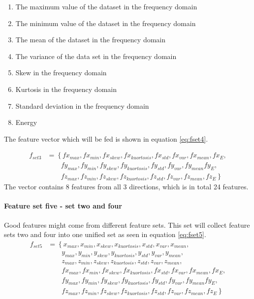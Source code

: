 \documentclass[USenglish]{ifimaster}  %
\begin{document}
\begin{enumerate}
		\item The maximum value of the dataset in the frequency domain
		\item The minimum value of the dataset in the frequency domain
		\item The mean of the dataset in the frequency domain
		\item The variance of the data set in the frequency domain
		\item Skew in the frequency domain
		\item Kurtosis in the frequency domain 
		\item Standard deviation in the frequency domain
		\item Energy 
\end{enumerate}
The feature vector which will be fed is shown in equation \ref{eq:fset4}.

\begin{align}\label{eq:fset4}
	f_{set3} &= \left\{fx_{max},fx_{min},fx_{skew},fx_{kuortosis},fx_{std},fx_{var},fx_{mean},fx_{E}, \right.\nonumber\\
	&\qquad \left.{} fy_{max},fy_{min},fy_{skew},fy_{kuortosis},fy_{std},fy_{var},fy_{mean}fy_{E}, \right.\nonumber\\
	&\qquad \left.{} fz_{max},fz_{min},fz_{skew},fz_{kuortosis},fz_{std},fz_{var},fz_{mean},fz_{E} \right\}
	\end{align}
The vector contains 8 features from all 3 directions, which is in total 24 features. 
	
\paragraph{Feature set five - set two and four} 
Good features might come from different feature sets. This set will collect feature sets two and four into one unified set as seen in equation \ref{eq:fset5}. 
	\begin{align}\label{eq:fset5}
	f_{set5} &= \left\{x_{max},x_{min},x_{skew},x_{kuortosis},x_{std},x_{var},x_{mean}, \right.\nonumber\\
	&\qquad \left.{}   y_{max},y_{min},y_{skew},y_{kuortosis},y_{std},y_{var},y_{mean}, \right.\nonumber\\
	&\qquad \left.{}  z_{max},z_{min},z_{skew},z_{kuortosis},z_{std},z_{var},z_{mean}, \right.\nonumber\\
	&\qquad \left.{} fx_{max},fx_{min},fx_{skew},fx_{kuortosis},fx_{std},fx_{var},fx_{mean},fx_{E}, \right.\nonumber\\
	&\qquad \left.{} fy_{max},fy_{min},fy_{skew},fy_{kuortosis},fy_{std},fy_{var},fy_{mean}fy_{E}, \right.\nonumber\\
	&\qquad \left.{} fz_{max},fz_{min},fz_{skew},fz_{kuortosis},fz_{std},fz_{var},fz_{mean},fz_{E} \right\}
	\end{align}
	
\end{document}
